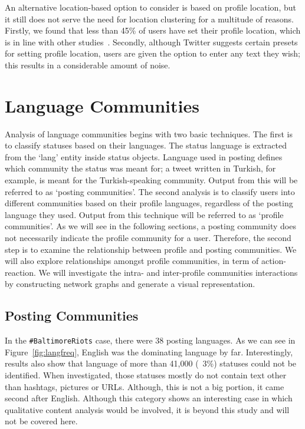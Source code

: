 \documentclass[conference]{IEEEtran}
\begin{document}
An alternative location-based option to consider is based on profile
location, but it still does not serve the need for location clustering
for a multitude of reasons. Firstly, we found that less than 45\% of
users have set their profile location, which is in line with other
studies~\cite{graham-et-al:2014}. Secondly, although Twitter suggests
certain presets for setting profile location, users are given the
option to enter any text they wish; this results in a considerable
amount of noise.

\section{Language Communities}\label{langcomm}

Analysis of language communities begins with two basic techniques. The
first is to classify statuses based on their languages. The status
language is extracted from the `lang' entity inside status
objects. Language used in posting defines which community the status
was meant for; a tweet written in Turkish, for example, is meant for
the Turkish-speaking community. Output from this will be referred to
as `posting communities'. The second analysis is to classify users
into different communities based on their profile languages,
regardless of the posting language they used. Output from this
technique will be referred to as `profile communities'. As we will see
in the following sections, a posting community does not necessarily
indicate the profile community for a user. Therefore, the second step
is to examine the relationship between profile and posting
communities. We will also explore relationships amongst profile
communities, in term of action-reaction. We will investigate the
intra- and inter-profile communities interactions by constructing
network graphs and generate a visual representation.

\subsection{Posting Communities}

In the {\texttt{\#BaltimoreRiots}} case, there were 38 posting
languages. As we can see in Figure~\ref{fig:langfreq}, English was the
dominating language by far. Interestingly, results also show that
language of more than 41,000 (~3\%) statuses could not be
identified. When investigated, those statuses mostly do not contain
text other than hashtags, pictures or URLs. Although, this is not a
big portion, it came second after English. Although this category
shows an interesting case in which qualitative content analysis would
be involved, it is beyond this study and will not be covered here.
\end{document}
